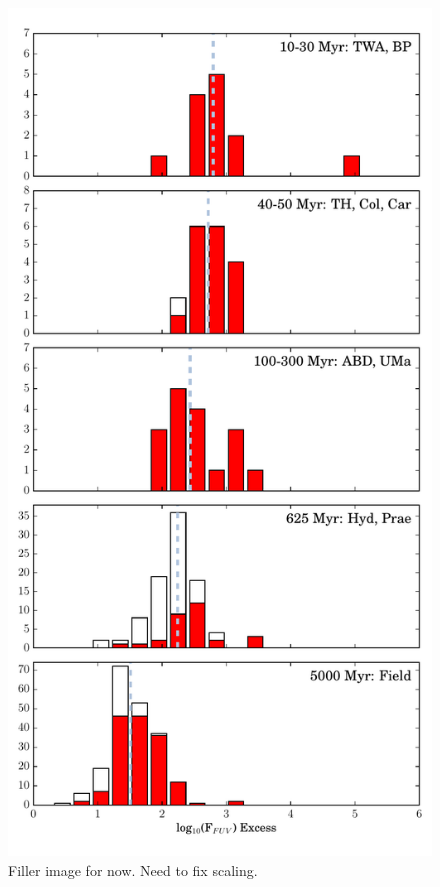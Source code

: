 \documentclass[twocolumn]{aastex62}
\begin{document}
\begin{figure}[t]
\centering
\includegraphics[width=\linewidth]{histfd_FUV.pdf}
\caption{Filler image for now. Need to fix scaling. \label{fig:histfd}}
\end{figure}
\end{document}
